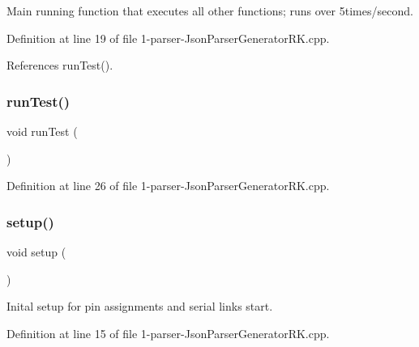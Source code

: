 Main running function that executes all other functions; runs over 5times/second. 



Definition at line 19 of file 1-\/parser-\/\+Json\+Parser\+Generator\+R\+K.\+cpp.



References run\+Test().

\mbox{\label{1-parser-_json_parser_generator_r_k_8cpp_a822f652c6fc2f163c182a6e5fe922c23}} 
\subsubsection{\texorpdfstring{run\+Test()}{runTest()}}
{\footnotesize\ttfamily void run\+Test (\begin{DoxyParamCaption}{ }\end{DoxyParamCaption})}



Definition at line 26 of file 1-\/parser-\/\+Json\+Parser\+Generator\+R\+K.\+cpp.

\mbox{\label{1-parser-_json_parser_generator_r_k_8cpp_a4fc01d736fe50cf5b977f755b675f11d}} 
\subsubsection{\texorpdfstring{setup()}{setup()}}
{\footnotesize\ttfamily void setup (\begin{DoxyParamCaption}{ }\end{DoxyParamCaption})}



Inital setup for pin assignments and serial links start. 



Definition at line 15 of file 1-\/parser-\/\+Json\+Parser\+Generator\+R\+K.\+cpp.



